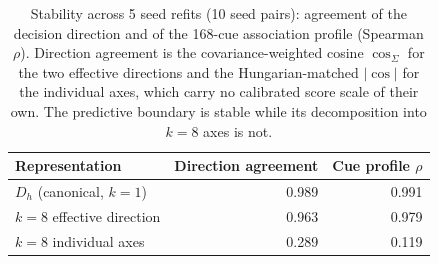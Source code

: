 \begin{table}[!ht]
\centering
\scriptsize
\begin{tabular}{lrr}
\toprule
Representation & Direction agreement & Cue profile $\rho$ \\
\midrule
$D_h$ (canonical, $k{=}1$) & 0.989 & 0.991 \\
$k{=}8$ effective direction & 0.963 & 0.979 \\
$k{=}8$ individual axes & 0.289 & 0.119 \\
\bottomrule
\end{tabular}
\caption{Stability across 5 seed refits (10 seed pairs): agreement of the decision direction and of the 168-cue association profile (Spearman $\rho$). Direction agreement is the covariance-weighted cosine $\cos_\Sigma$ for the two effective directions and the Hungarian-matched $|\cos|$ for the individual axes, which carry no calibrated score scale of their own. The predictive boundary is stable while its decomposition into $k{=}8$ axes is not.}
\label{tab:rev:stability}
\end{table}
